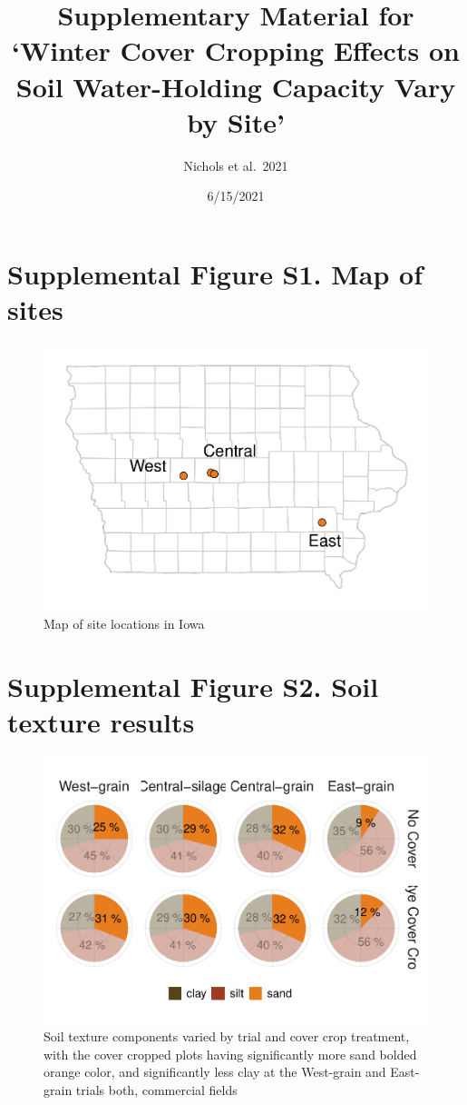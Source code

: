 \documentclass[
]{article}
\title{Supplementary Material for `Winter Cover Cropping Effects on Soil
Water-Holding Capacity Vary by Site'}
\author{Nichols et al.~2021}
\date{6/15/2021}
\begin{document}
\maketitle

\hypertarget{supplemental-figure-s1.-map-of-sites}{%
\section{Supplemental Figure S1. Map of
sites}\label{supplemental-figure-s1.-map-of-sites}}

\begin{figure}
\centering
\includegraphics{rmd-supp-mat_files/figure-latex/sitemap-1.pdf}
\caption{Map of site locations in Iowa}
\end{figure}

\hypertarget{supplemental-figure-s2.-soil-texture-results}{%
\section{Supplemental Figure S2. Soil texture
results}\label{supplemental-figure-s2.-soil-texture-results}}

\begin{figure}
\centering
\includegraphics{rmd-supp-mat_files/figure-latex/texture-1.pdf}
\caption{Soil texture components varied by trial and cover crop
treatment, with the cover cropped plots having significantly more sand
bolded orange color, and significantly less clay at the West-grain and
East-grain trials both, commercial fields}
\end{figure}
\end{document}
